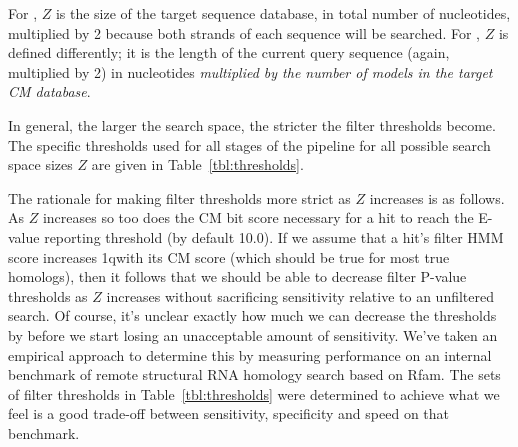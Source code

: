 For , $Z$ is the size of the target sequence database,
in total number of nucleotides, multiplied by 2 because both strands
of each sequence will be searched. For , $Z$ is defined
differently; it is the length of the current query sequence (again,
multiplied by 2) in nucleotides \emph{multiplied by the number of
models in the target CM database}. 

In general, the larger the search space, the stricter the filter
thresholds become. The specific thresholds used for all stages of the
pipeline for all possible search space sizes $Z$ are given in
Table~\ref{tbl:thresholds}.

The rationale for making filter thresholds more strict as $Z$
increases is as follows. As $Z$ increases so too does the CM bit score
necessary for a hit to reach the E-value reporting threshold (by
default 10.0). If we assume that a hit's filter HMM score increases
1qwith its CM score (which should be true for most true homologs), then it
follows that we should be able to decrease filter P-value thresholds
as $Z$ increases without sacrificing sensitivity relative to an
unfiltered search. Of course, it's unclear exactly how much we can
decrease the thresholds by before we start losing an unacceptable
amount of sensitivity. We've taken an empirical approach to determine
this by measuring performance on an internal benchmark of remote
structural RNA homology search based on Rfam. The sets of filter
thresholds in Table~\ref{tbl:thresholds} were determined to achieve
what we feel is a good trade-off between sensitivity, specificity and
speed on that benchmark.

